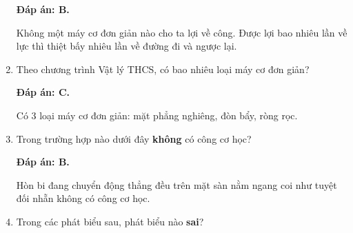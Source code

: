 \begin{enumerate}[label=\bfseries Câu \arabic*:]
	\loigiai
	{\textbf{Đáp án: B.}
		
		Không một máy cơ đơn giản nào cho ta lợi về công. Được lợi bao nhiêu lần về lực thì thiệt bấy nhiêu lần về đường đi và ngược lại.
		
	}
	\item {}
	
	\cauhoi
	{Theo chương trình Vật lý THCS, có bao nhiêu loại máy cơ đơn giản?
	}
	
	\loigiai
	{\textbf{Đáp án: C.}
		
	Có 3 loại máy cơ đơn giản: mặt phẳng nghiêng, đòn bẩy, ròng rọc.
		
		
	}
	\item {}
	
	\cauhoi
	{
		Trong trường hợp nào dưới đây \textbf{không} có công cơ học?
	}
	
	\loigiai
	{\textbf{Đáp án: B.}
		
	Hòn bi đang chuyển động thẳng đều trên mặt sàn nằm ngang coi như tuyệt đối nhẵn không có công cơ học.
		
	}
	
	\item {}
	
	\cauhoi
	{Trong các phát biểu sau, phát biểu nào \textbf{sai}?
		
}
\end{enumerate}
